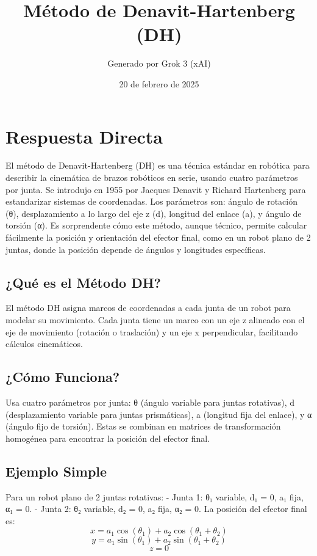 \documentclass{article}%
\title{Método de Denavit{-}Hartenberg (DH)}%
\author{Generado por Grok 3 (xAI)}%
\date{20 de febrero de 2025}%
\begin{document}
%
\normalsize%
\maketitle%
\section{Respuesta Directa}%
\label{sec:RespuestaDirecta}%
El método de Denavit{-}Hartenberg (DH) es una técnica estándar en robótica para describir la cinemática de brazos robóticos en serie, usando cuatro parámetros por junta.\newline%
%
Se introdujo en 1955 por Jacques Denavit y Richard Hartenberg para estandarizar sistemas de coordenadas.\newline%
%
Los parámetros son: ángulo de rotación (θ), desplazamiento a lo largo del eje z (d), longitud del enlace (a), y ángulo de torsión (α).\newline%
%
Es sorprendente cómo este método, aunque técnico, permite calcular fácilmente la posición y orientación del efector final, como en un robot plano de 2 juntas, donde la posición depende de ángulos y longitudes específicas.\newline%
%
\subsection{¿Qué es el Método DH?}%
\label{subsec:QueselMtodoDH?}%
El método DH asigna marcos de coordenadas a cada junta de un robot para modelar su movimiento. Cada junta tiene un marco con un eje z alineado con el eje de movimiento (rotación o traslación) y un eje x perpendicular, facilitando cálculos cinemáticos.\newline%

%
\subsection{¿Cómo Funciona?}%
\label{subsec:CmoFunciona?}%
Usa cuatro parámetros por junta: θ (ángulo variable para juntas rotativas), d (desplazamiento variable para juntas prismáticas), a (longitud fija del enlace), y α (ángulo fijo de torsión). Estas se combinan en matrices de transformación homogénea para encontrar la posición del efector final.\newline%

%
\subsection{Ejemplo Simple}%
\label{subsec:EjemploSimple}%
Para un robot plano de 2 juntas rotativas:\newline%
%
{-} Junta 1: θ₁ variable, d₁ = 0, a₁ fija, α₁ = 0.\newline%
%
{-} Junta 2: θ₂ variable, d₂ = 0, a₂ fija, α₂ = 0.\newline%
%
La posición del efector final es:\newline%
%
\[%
x = a_1 \cos(\theta_1) + a_2 \cos(\theta_1 + \theta_2)%
\]%
\[%
y = a_1 \sin(\theta_1) + a_2 \sin(\theta_1 + \theta_2)%
\]%
\[%
z = 0%
\]

%
\end{document}
